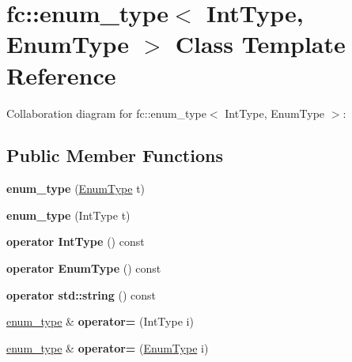 \hypertarget{classfc_1_1enum__type}{}\section{fc\+:\+:enum\+\_\+type$<$ Int\+Type, Enum\+Type $>$ Class Template Reference}
\label{classfc_1_1enum__type}


Collaboration diagram for fc\+:\+:enum\+\_\+type$<$ Int\+Type, Enum\+Type $>$\+:
\subsection*{Public Member Functions}
\begin{DoxyCompactItemize}
\item 
\mbox{\label{classfc_1_1enum__type_a3078b4135df95e31bfc2ae29c1ee5faf}} 
{\bfseries enum\+\_\+type} (\mbox{\hyperlink{struct_enum_type}{Enum\+Type}} t)
\item 
\mbox{\label{classfc_1_1enum__type_ad8d102851f090f6ff22523a56b187262}} 
{\bfseries enum\+\_\+type} (Int\+Type t)
\item 
\mbox{\label{classfc_1_1enum__type_a22c917928cbb64ddb37e6ecc3ecf8c23}} 
{\bfseries operator Int\+Type} () const
\item 
\mbox{\label{classfc_1_1enum__type_af0773eac818e95a1f6addd5dc892a44d}} 
{\bfseries operator Enum\+Type} () const
\item 
\mbox{\label{classfc_1_1enum__type_ae0627e8e9651ef61c1e66ba3b570ff0a}} 
{\bfseries operator std\+::string} () const
\item 
\mbox{\label{classfc_1_1enum__type_ae9f685bb1a3400f4ba16cec4ad1f0b89}} 
\mbox{\hyperlink{classfc_1_1enum__type}{enum\+\_\+type}} \& {\bfseries operator=} (Int\+Type i)
\item 
\mbox{\label{classfc_1_1enum__type_a10fec0ad3f736434b38d15cfd37ad10b}} 
\mbox{\hyperlink{classfc_1_1enum__type}{enum\+\_\+type}} \& {\bfseries operator=} (\mbox{\hyperlink{struct_enum_type}{Enum\+Type}} i)

\end{DoxyCompactItemize}
